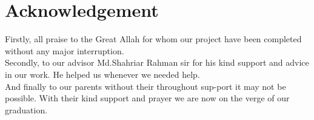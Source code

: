 \section*{Acknowledgement}
Firstly, all praise to the Great Allah for whom our project have been completed without any major interruption.\\
Secondly, to our advisor Md.Shahriar Rahman sir for his kind support and advice in our work. He helped us whenever we needed help.\\

And finally to our parents without their throughout sup-port it may not be possible. With their kind support and prayer we are now on the verge of our graduation.